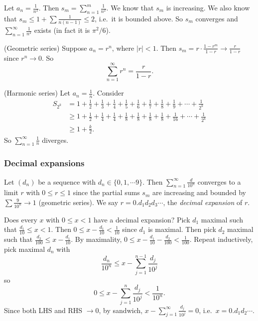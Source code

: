 \documentclass[a4paper]{article}
\begin{document}
\begin{eg}
  Let $a_n = \frac{1}{n^2}$. Then $s_m = \sum_{n = 1}^{m} \frac{1}{n^2}$. We know that $s_m$ is increasing. We also know that $s_m \leq 1 + \sum \frac{1}{n(n -1)} \leq 2$, i.e.\ it is bounded above. So $s_m$ converges and $\sum_{n = 1}^{\infty} \frac{1}{n^2}$ exists (in fact it is $\pi^2/6$).
\end{eg}

\begin{eg}
  (Geometric series) Suppose $a_n = r^n$, where $|r| < 1$. Then $s_m = r\cdot \frac{1 - r^m}{1 - r} \to \frac{r}{1- r}$ since $r^n \to 0$. So
  \[
    \sum_{n = 1}^\infty r^n = \frac{r}{1 - r}.
  \]
\end{eg}

\begin{eg}
  (Harmonic series) Let $a_n = \frac{1}{n}$. Consider
  \begin{align*}
    S_{2^k} &= 1 + \frac{1}{2} + \frac{1}{3} + \frac{1}{4} + \frac{1}{5} + \frac{1}{6} + \frac{1}{7} + \frac{1}{8} + \frac{1}{9} + \cdots + \frac{1}{2^k}\\
    & \geq 1 + \frac{1}{2} + \frac{1}{4} + \frac{1}{4} + \frac{1}{8} + \frac{1}{8} + \frac{1}{8} + \frac{1}{8} + \frac{1}{16} + \cdots + \frac{1}{2^k}\\
    &\geq 1 + \frac{k}{2}.
  \end{align*}
  So $\displaystyle \sum_{n = 1}^\infty\frac{1}{n}$ diverges.
\end{eg}

\subsubsection*{Decimal expansions}
\begin{defi}
  Let $(d_n)$ be a sequence with $d_n\in \{0, 1, \cdots 9\}$. Then $\displaystyle \sum_{n = 1}^\infty \frac{d}{10^n}$ converges to a limit $r$ with $0 \leq r \leq 1$ since the partial sums $s_m$ are increasing and bounded by $\sum \frac{9}{10^n}\to 1$ (geometric series). We say $r = 0.d_1d_2d_3\cdots$, the \emph{decimal expansion} of $r$.
\end{defi}

Does every $x$ with $0 \leq x < 1$ have a decimal expansion?
Pick $d_1$ maximal such that $\frac{d_1}{10} \leq x < 1$. Then $0 \leq x - \frac{d_1}{10} < \frac{1}{10}$ since $d_1$ is maximal. Then pick $d_2$ maximal such that $\frac{d_2}{100} \leq x - \frac{d_1}{10}$. By maximality, $0 \leq x - \frac{d_1}{10} - \frac{d_2}{100} < \frac{1}{100}$. Repeat inductively, pick maximal $d_n$ with
\[
  \frac{d_n}{10^n} \leq x- \sum_{j = 1}^{n - 1} \frac{d_j}{10^j}
\]
so
\[
  0 \leq x - \sum_{j = 1}^n \frac{d_j}{10^j} < \frac{1}{10^n}.
\]
Since both LHS and RHS $\to 0$, by sandwich, $x - \sum_{j = 1}^\infty \frac{d_j}{10^j} = 0$, i.e.\ $x = 0.d_1d_2\cdots$.
\end{document}
